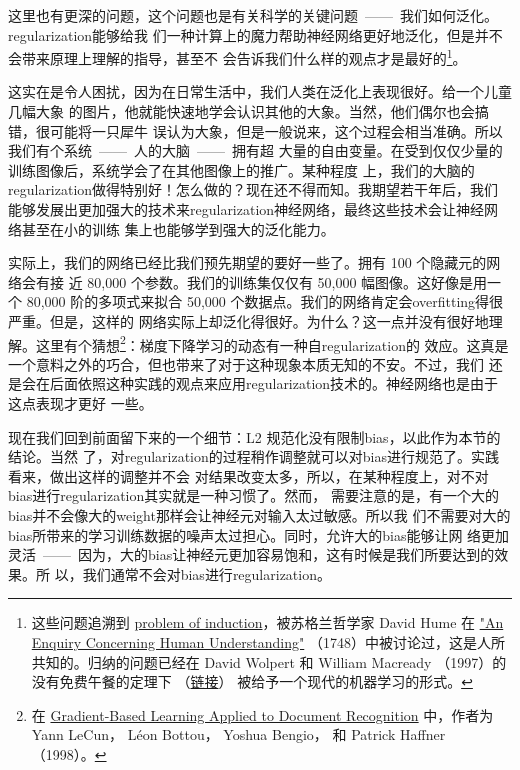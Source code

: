 这里也有更深的问题，这个问题也是有关科学的关键问题~——~我们如何泛化。\gls*{regularization}能够给我
们一种计算上的魔力帮助神经网络更好地泛化，但是并不会带来原理上理解的指导，甚至不
会告诉我们什么样的观点才是最好的\footnote{这些问题追溯到
  \href{http://en.wikipedia.org/wiki/Problem_of_induction}{problem of
    induction}，被苏格兰哲学家 David Hume 在
  \href{http://www.gutenberg.org/ebooks/9662}{"An Enquiry Concerning Human
    Understanding"} （1748）中被讨论过，这是人所共知的。归纳的问题已经在 David Wolpert 
		和 William Macready （1997）的没有免费午餐的定理下%
		（\href{http://ieeexplore.ieee.org/xpl/articleDetails.jsp?tp=&arnumber=585893}{链接}）%
		被给予一个现代的机器学习的形式。}。

这实在是令人困扰，因为在日常生活中，我们人类在泛化上表现很好。给一个儿童几幅大象
的图片，他就能快速地学会认识其他的大象。当然，他们偶尔也会搞错，很可能将一只犀牛
误认为大象，但是一般说来，这个过程会相当准确。所以我们有个系统~——~人的大脑~——~拥有超
大量的自由变量。在受到仅仅少量的训练图像后，系统学会了在其他图像上的推广。某种程度
上，我们的大脑的\gls*{regularization}做得特别好！怎么做的？现在还不得而知。我期望若干年后，我们
能够发展出更加强大的技术来\gls*{regularization}神经网络，最终这些技术会让神经网络甚至在小的训练
集上也能够学到强大的泛化能力。

实际上，我们的网络已经比我们预先期望的要好一些了。拥有 100 个隐藏元的网络会有接
近 80,000 个参数。我们的训练集仅仅有 50,000 幅图像。这好像是用一个 80,000
阶的多项式来拟合 50,000 个数据点。我们的网络肯定会\gls*{overfitting}得很严重。但是，这样的
网络实际上却泛化得很好。为什么？这一点并没有很好地理解。这里有个猜想\footnote{在
  \href{http://yann.lecun.com/exdb/publis/pdf/lecun-01a.pdf}{Gradient-Based
    Learning Applied to Document Recognition} 中，作者为 Yann LeCun， Léon Bottou，
  Yoshua Bengio， 和 Patrick Haffner （1998）。}：梯度下降学习的动态有一种自\gls*{regularization}的
效应。这真是一个意料之外的巧合，但也带来了对于这种现象本质无知的不安。不过，我们
还是会在后面依照这种实践的观点来应用\gls*{regularization}技术的。神经网络也是由于这点表现才更好
一些。

现在我们回到前面留下来的一个细节：L2 规范化没有限制\gls*{bias}，以此作为本节的结论。当然
了，对\gls*{regularization}的过程稍作调整就可以对\gls*{bias}进行规范了。实践看来，做出这样的调整并不会
对结果改变太多，所以，在某种程度上，对不对\gls*{bias}进行\gls*{regularization}其实就是一种习惯了。然而，
需要注意的是，有一个大的\gls*{bias}并不会像大的\gls*{weight}那样会让神经元对输入太过敏感。所以我
们不需要对大的\gls*{bias}所带来的学习训练数据的噪声太过担心。同时，允许大的\gls*{bias}能够让网
络更加灵活~——~因为，大的\gls*{bias}让神经元更加容易饱和，这有时候是我们所要达到的效果。所
以，我们通常不会对\gls*{bias}进行\gls*{regularization}。

